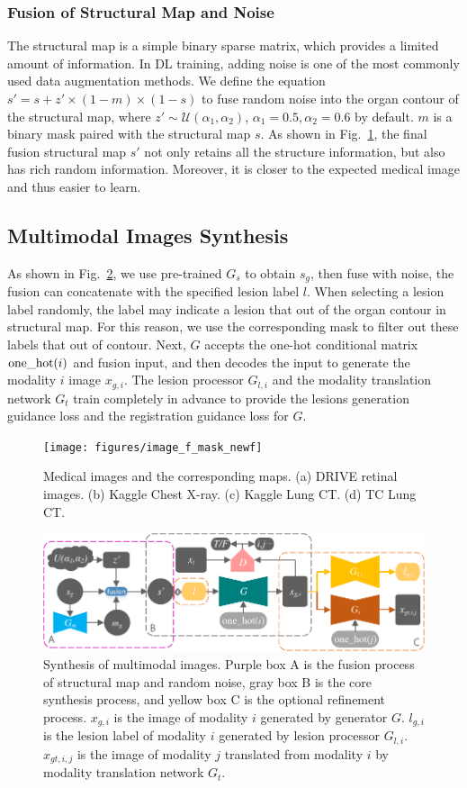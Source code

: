 \documentclass[runningheads]{llncs}
\begin{document}
	\subsubsection{Fusion of Structural Map and Noise}	
	The structural map is a simple binary sparse matrix, which provides a limited amount of information. In DL training, adding noise is one of the most commonly used data augmentation methods. We define the equation $s'=s+z'\times(1-m)\times(1-s)$ to fuse random noise into the organ contour of the structural map, where $z'\sim\mathcal{U}(\alpha_1,\alpha_2)$, $\alpha_1 =0.5,\alpha_2=0.6$ by default. $m$ is a binary mask paired with the structural map $s$. As shown in Fig.~\ref{image_and_f}, the final fusion structural map $s'$ not only retains all the structure information, but also has rich random information. Moreover, it is closer to the expected medical image and thus easier to learn. 	
	\subsection{Multimodal Images Synthesis}
	As shown in Fig.~\ref{mm_mri_generate}, we use pre-trained $G_s$ to obtain $s_g$, then fuse with noise, the fusion can concatenate with the specified lesion label $l$. When selecting a lesion label randomly, the label may indicate a lesion that out of the organ contour in structural map. For this reason, we use the corresponding mask to filter out these labels that out of contour. Next, $G$ accepts the one-hot conditional matrix ${\rm one\_hot}(i)$ and fusion input, and then decodes the input to generate the modality $i$ image $x_{g,i}$. The lesion processor $G_{l,i}$ and the modality translation network $G_t$ train completely in advance to provide the lesions generation guidance loss and the registration guidance loss for $G$.
	\begin{figure}[th]
		\centering
		\texttt{[image: figures/image\_f\_mask\_newf]}
		\caption{Medical images and the corresponding maps. (a) DRIVE retinal images. (b) Kaggle Chest X-ray. (c) Kaggle Lung CT. (d) TC Lung CT.}
		\label{image_and_f}
	\end{figure}
	\begin{figure}[th]
		\centering
		\includegraphics[width=1\columnwidth]{figures/mm_mri_generate_train}
		\caption{Synthesis of multimodal images. Purple box A is the fusion process of structural map and random noise, gray box B is the core synthesis process, and yellow box C is the optional refinement process. 
			$x_{g,i}$ is the image of modality $i$ generated by generator $G$. 
			$l_{g,i}$ is the lesion label of modality $i$ generated by lesion processor $G_{l,i}$.
			$x_{gt,i,j}$ is the image of modality $j$ translated from modality $i$ by modality translation network $G_t$.
		}
		\label{mm_mri_generate}
	\end{figure}
	
\end{document}
